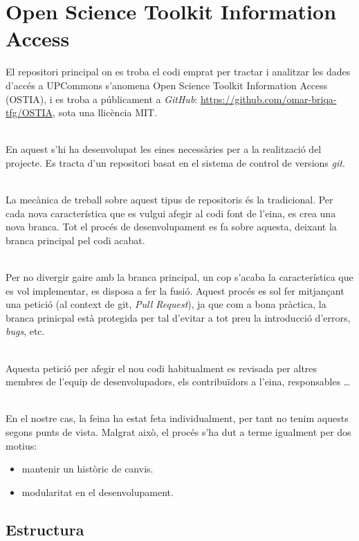 \chapter{Open Science Toolkit Information Access}\label{ch:ostia}
El repositori principal on es troba el codi emprat per tractar i analitzar les dades d'accés a \gls{UPCommons} s'anomena Open Science Toolkit Information Access (\gls{OSTIA}), i es troba a públicament a \textit{GitHub}: \url{https://github.com/omar-briqa-tfg/OSTIA}, sota una llicència MIT.

\noindent \\
En aquest s'hi ha desenvolupat les eines necessàries per a la realització del projecte.
Es tracta d'un repositori basat en el sistema de control de versions \textit{\gls{git}}.

\noindent \\
La mecànica de treball sobre aquest tipus de repositoris és la tradicional.
Per cada nova característica que es vulgui afegir al codi font de l'eina, es crea una nova branca.
Tot el procés de desenvolupament es fa sobre aquesta, deixant la branca principal pel codi acabat.

\noindent \\
Per no divergir gaire amb la branca principal, un cop s'acaba la característica que es vol implementar, es disposa a fer la fusió.
Aquest procés es sol fer mitjançant una petició (al context de git, \textit{Pull Request}), ja que com a bona pràctica, la branca prinicpal està protegida per tal d'evitar a tot preu la introducció d'errors, \textit{bugs}, etc.

\noindent \\
Aquesta petició per afegir el nou codi habitualment es revisada per altres membres de l'equip de desenvolupadors, els contribuïdors a l'eina, responsables \dots

\noindent \\
En el nostre cas, la feina ha estat feta individualment, per tant no tenim aquests segons punts de vista.
Malgrat això, el procés s'ha dut a terme igualment per dos motius:

\begin{itemize}
    \item mantenir un històric de canvis.
    \item modularitat en el desenvolupament.
\end{itemize}{}

\clearpage

\section*{Estructura}\label{sec:ostia-structure}

